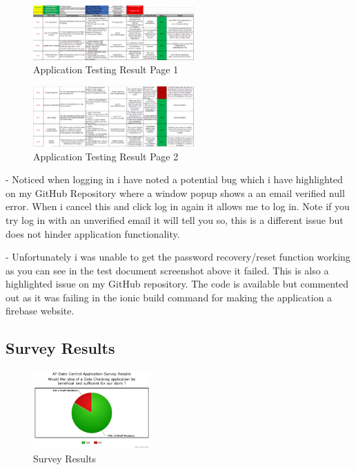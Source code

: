\begin{figure}[h!]
	\caption{Application Testing Result Page 1}
	\label{image:test1}
	\centering
	\includegraphics[width=0.55\textwidth]{images/testResults1.PNG}
\end{figure}
\begin{figure}[h!]
	\caption{Application Testing Result Page 2}
	\label{image:test2}
	\centering
	\includegraphics[width=0.55\textwidth]{images/testResults2.PNG}
\end{figure}
\newpage
- Noticed when logging in i have noted a potential bug which i have highlighted on my GitHub Repository where a window popup shows a an email verified null error. When i cancel this and click log in again it allows me to log in. Note if you try log in with an unverified email it will tell you so, this is a different issue but does not hinder application functionality. 
\newline

- Unfortunately i was unable to get the password recovery/reset function working as you can see in the test document screenshot above it failed. This is also a highlighted issue on my GitHub repository. The code is available but commented out as it was failing in the ionic build command for making the application a firebase website.

\subsection{Survey Results}

\begin{figure}[h!]
	\caption{Survey Results}
	\label{image:surveyResults}
	\centering
	\includegraphics[width=0.4\textwidth]{images/AF-Date-Control-Survey-Results.jpeg}
\end{figure}


